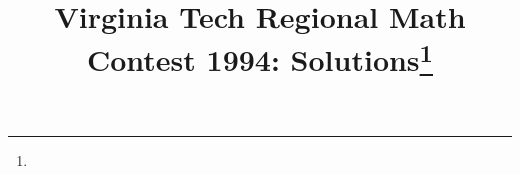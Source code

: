 \documentclass[10pt]{article}
\begin{document}
\title{Virginia Tech Regional Math Contest 1994: Solutions\footnote{\disclaimer}}
\author{\vspace{-2ex}}
\date{\vspace{-5ex}} %
\maketitle

%

%

%

%

%

%

%

%
\end{document}
